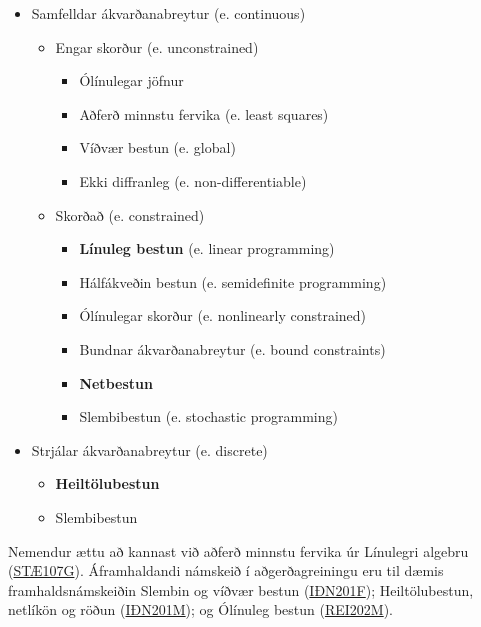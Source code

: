 \begin{itemize}
 \item Samfelldar ákvarðanabreytur (e. continuous) 
 \begin{itemize}
  \item Engar skorður (e. unconstrained)  
  \begin{itemize}
   \item Ólínulegar jöfnur 
   \item Aðferð minnstu fervika (e. least squares) 
   \item Víðvær bestun (e. global)
   \item Ekki diffranleg (e. non-differentiable)  
  \end{itemize}
  \item Skorðað (e. constrained)  
  \begin{itemize}
   \item {\bf Línuleg bestun} (e. linear programming)  
   \item Hálfákveðin bestun (e. semidefinite programming)
   \item Ólínulegar skorður (e. nonlinearly constrained)  
   \item Bundnar ákvarðanabreytur (e. bound constraints)  
   \item {\bf Netbestun}
   \item Slembibestun (e. stochastic programming)
  \end{itemize}
 \end{itemize}
 \item Strjálar ákvarðanabreytur (e. discrete)  
 \begin{itemize}
  \item {\bf Heiltölubestun} 
  \item Slembibestun 
 \end{itemize}
\end{itemize}
Nemendur ættu að kannast við aðferð minnstu fervika úr Línulegri algebru (\href{https://ugla.hi.is/kennsluskra/index.php?tab=nam\&chapter=namskeid\&id=09101420106}{STÆ107G}). Áframhaldandi námskeið í aðgerðagreiningu eru til dæmis framhaldsnámskeiðin Slembin og víðvær bestun (\href{https://ugla.hi.is/kennsluskra/index.php?tab=nam\&chapter=namskeid\&id=08233620110}{IÐN201F}); Heiltölubestun, net\-líkön og röðun (\href{https://ugla.hi.is/kennsluskra/index.php?tab=nam\&chapter=namskeid\&id=08223820110}{IÐN201M}); og Ólínuleg bestun (\href{https://ugla.hi.is/kennsluskra/index.php?tab=nam\&chapter=namskeid\&id=08726820110}{REI202M}).

